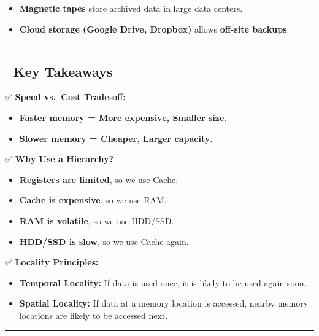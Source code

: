 \documentclass[
]{article}
\providecommand{\tightlist}{%
  \setlength{\itemsep}{0pt}\setlength{\parskip}{0pt}}
\begin{document}
\begin{itemize}
\tightlist
\item
  \textbf{Magnetic tapes} store archived data in large data centers.
\item
  \textbf{Cloud storage (Google Drive, Dropbox)} allows \textbf{off-site
  backups}.
\end{itemize}

\begin{center}\rule{0.5\linewidth}{0.5pt}\end{center}

\subsection{\texorpdfstring{\textbf{📌 Key
Takeaways}}{📌 Key Takeaways}}\label{key-takeaways}

✅ \textbf{Speed vs.~Cost Trade-off:}

\begin{itemize}
\tightlist
\item
  \textbf{Faster memory = More expensive, Smaller size}.
\item
  \textbf{Slower memory = Cheaper, Larger capacity}.
\end{itemize}

✅ \textbf{Why Use a Hierarchy?}

\begin{itemize}
\tightlist
\item
  \textbf{Registers are limited}, so we use Cache.
\item
  \textbf{Cache is expensive}, so we use RAM.
\item
  \textbf{RAM is volatile}, so we use HDD/SSD.
\item
  \textbf{HDD/SSD is slow}, so we use Cache again.
\end{itemize}

✅ \textbf{Locality Principles:}

\begin{itemize}
\tightlist
\item
  \textbf{Temporal Locality:} If data is used once, it is likely to be
  used again soon.
\item
  \textbf{Spatial Locality:} If data at a memory location is accessed,
  nearby memory locations are likely to be accessed next.
\end{itemize}

\begin{center}\rule{0.5\linewidth}{0.5pt}\end{center}
\end{document}

